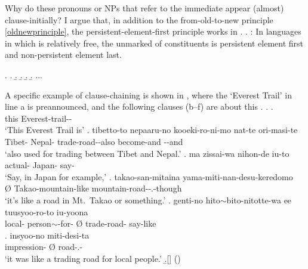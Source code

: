 Why do these pronouns or NPs that refer to the immediate  appear (almost) clause-initially?
I argue that, in addition to the from-old-to-new principle \ref{oldnewprinciple},
the persistent-element-first principle works in .
%
\ex. \label{PerFirstPrinciple}:
 In languages in which  is relatively free,
 the unmarked  of constituents is persistent element first and non-persistent element last.

%
\ex.
 \a. 
 \b. 
 \b. 
 \b. 
 \b. ...

A specific example of clause-chaining is shown in \Next,
where the  `Everest Trail' in line a is preannounced,
and the following clauses (b--f) are about this .
%
\ex.
\ag.   \\
	this Everest-trail-- \\
	`{This Everest Trail} is'
\bg. tibetto-to nepaaru-no kooeki-ro-ni-mo nat-te ori-masi-te \\
	Tibet- Nepal- trade-road--also become-and --and \\
	`also used for trading  between Tibet and Nepal.'
\cg. ma zissai-wa nihon-de iu-to \tp{\dvline} \\
	 actual- Japan- say- \\
	`Say, in Japan for example,'
\dg. \EM{\O} takao-san-mitaina yama-miti-nan-desu-keredomo \\
	{\O} Takao-mountain-like mountain-road--.-though \\
	`it's like a road in Mt.\ Takao or something.'
\eg. genti-no hito$\sim$bito-nitotte-wa ee \EM{\O} tuusyoo-ro-to iu-yoona \\
	local- person$\sim$-for-  {\O} trade-road- say-like \\
\bg. insyoo-no \EM{\O} miti-desi-ta \\
	 impression- {\O} road-.- \\
 `{it} was like a trading road for local people.'
 \b.[] \hfill{()}

